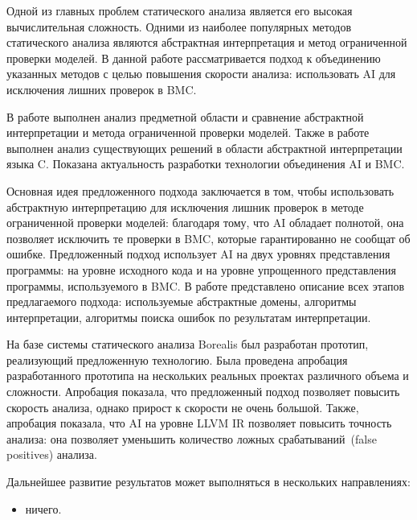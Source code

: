 \conclusion
Одной из главных проблем статического анализа является его высокая 
вычислительная сложность. Одними из наиболее популярных методов статического
анализа являются абстрактная интерпретация и метод ограниченной проверки моделей.
В данной работе рассматривается подход к объединению указанных методов с целью
повышения скорости анализа: использовать AI для исключения лишних проверок в BMC.

В работе выполнен анализ предметной области и сравнение абстрактной интерпретации
и метода ограниченной проверки моделей. Также в работе выполнен анализ 
существующих решений в области абстрактной интерпретации языка C. Показана 
актуальность разработки технологии объединения AI и BMC.

Основная идея предложенного подхода заключается в том, чтобы использовать 
абстрактную интерпретацию для исключения лишник проверок в методе ограниченной 
проверки моделей: благодаря тому, что AI обладает полнотой, она позволяет 
исключить те проверки в BMC, которые гарантированно не сообщат об ошибке. 
Предложенный подход использует AI на двух уровнях представления программы:
на уровне исходного кода и на уровне упрощенного представления программы, 
используемого в BMC. В работе представлено описание всех этапов предлагаемого
подхода: используемые абстрактные домены, алгоритмы интерпретации, алгоритмы
поиска ошибок по результатам интерпретации.

На базе системы статического анализа Borealis был разработан прототип, 
реализующий предложенную технологию. Была проведена апробация разработанного
прототипа на нескольких реальных проектах различного объема и сложности. 
Апробация показала, что предложенный подход позволяет повысить скорость анализа,
однако прирост к скорости не очень большой. Также, апробация показала, что
AI на уровне LLVM IR позволяет повысить точность анализа: она позволяет уменьшить
количество ложных срабатываний~(false positives) анализа.

Дальнейшее развитие результатов может выполняться в нескольких направлениях:
\begin{itemize}
\item ничего.
\end{itemize}